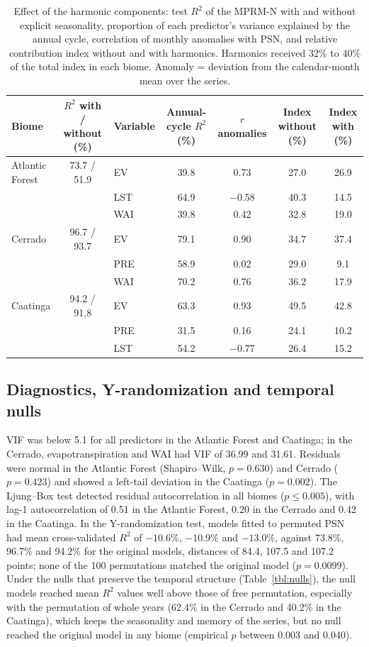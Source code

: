 \documentclass[a4paper,fleqn]{cas-dc}
\begin{document}
\begin{table}[htbp]
\caption{Effect of the harmonic components: test $R^2$ of the MPRM-N with and without explicit seasonality, proportion of each predictor's variance explained by the annual cycle, correlation of monthly anomalies with PSN, and relative contribution index without and with harmonics. Harmonics received 32\% to 40\% of the total index in each biome. Anomaly = deviation from the calendar-month mean over the series.}\label{tbl:harm}
\scriptsize
\begin{tabular*}{\tblwidth}{@{}LCLCCCC@{}}
\toprule
Biome & $R^2$ with / without (\%) & Variable & Annual-cycle $R^2$ (\%) & $r$ anomalies & Index without (\%) & Index with (\%) \\
\midrule
Atlantic Forest & 73.7 / 51.9 & EV & 39.8 & 0.73 & 27.0 & 26.9 \\
 & & LST & 64.9 & $-$0.58 & 40.3 & 14.5 \\
 & & WAI & 39.8 & 0.42 & 32.8 & 19.0 \\
Cerrado & 96.7 / 93.7 & EV & 79.1 & 0.90 & 34.7 & 37.4 \\
 & & PRE & 58.9 & 0.02 & 29.0 & 9.1 \\
 & & WAI & 70.2 & 0.76 & 36.2 & 17.9 \\
Caatinga & 94.2 / 91.8 & EV & 63.3 & 0.93 & 49.5 & 42.8 \\
 & & PRE & 31.5 & 0.16 & 24.1 & 10.2 \\
 & & LST & 54.2 & $-$0.77 & 26.4 & 15.2 \\
\bottomrule
\end{tabular*}
\end{table}

\subsection{Diagnostics, Y-randomization and temporal nulls}

VIF was below 5.1 for all predictors in the Atlantic Forest and Caatinga; in the Cerrado, evapotranspiration and WAI had VIF of 36.99 and 31.61. Residuals were normal in the Atlantic Forest (Shapiro--Wilk, $p = 0.630$) and Cerrado ($p = 0.423$) and showed a left-tail deviation in the Caatinga ($p = 0.002$). The Ljung--Box test detected residual autocorrelation in all biomes ($p \le 0.005$), with lag-1 autocorrelation of 0.51 in the Atlantic Forest, 0.20 in the Cerrado and 0.42 in the Caatinga. In the Y-randomization test, models fitted to permuted PSN had mean cross-validated $R^2$ of $-10.6\%$, $-10.9\%$ and $-13.0\%$, against 73.8\%, 96.7\% and 94.2\% for the original models, distances of 84.4, 107.5 and 107.2 points; none of the 100 permutations matched the original model ($p = 0.0099$). Under the nulls that preserve the temporal structure (Table~\ref{tbl:nulls}), the null models reached mean $R^2$ values well above those of free permutation, especially with the permutation of whole years (62.4\% in the Cerrado and 40.2\% in the Caatinga), which keeps the seasonality and memory of the series, but no null reached the original model in any biome (empirical $p$ between 0.003 and 0.040).
\end{document}
